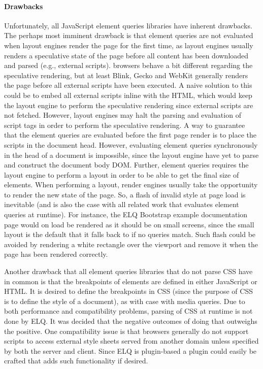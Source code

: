 \documentclass[a4paper,11pt]{kth-mag}
\begin{document}
    \paragraph{Drawbacks}
    Unfortunately, all \gls{JavaScript} element queries libraries have inherent drawbacks.
    The perhaps most imminent drawback is that element queries are not evaluated when \glspl{layout engine} render the page for the first time, as \glspl{layout engine} usually renders a speculative state of the page before all content has been downloaded and parsed (e.g., external scripts).
    \Glspl{browser} behave a bit different regarding the speculative rendering, but at least \gls{Blink}, \gls{Gecko} and \gls{WebKit} generally renders the page before all external scripts have been executed.
    A naive solution to this could be to embed all external scripts inline with the \gls{HTML}, which would keep the \gls{layout engine} to perform the speculative rendering since external scripts are not fetched.
    However, \glspl{layout engine} may halt the parsing and evaluation of script tags in order to perform the speculative rendering.
    A way to guarantee that the element queries are evaluated before the first page render is to place the scripts in the \gls{document} head.
    However, evaluating element queries synchronously in the head of a \gls{document} is impossible, since the \gls{layout engine} have yet to parse and construct the document body \gls{DOM}.
    Further, element queries requires the \gls{layout engine} to perform a layout in order to be able to get the final size of \glspl{element}.
    When performing a layout, render engines usually take the opportunity to render the new state of the page.
    So, a flash of invalid style at page load is inevitable (and is also the case with all related work that evaluates element queries at runtime).
    For instance, the \gls{ELQ} \gls{Bootstrap} example documentation page would on load be rendered as it should be on small screens, since the small layout is the default that it falls back to if no queries match.
    Such flash could be avoided by rendering a white rectangle over the \gls{viewport} and remove it when the page has been rendered correctly.

    Another drawback that all element queries libraries that do not parse \gls{CSS} have in common is that the breakpoints of \glspl{element} are defined in either \gls{JavaScript} or \gls{HTML}.
    It is desired to define the breakpoints in \gls{CSS} (since the purpose of \gls{CSS} is to define the style of a document), as with case with \gls{media queries}.
    Due to both performance and compatibility problems, parsing of \gls{CSS} at runtime is not done by \gls{ELQ}.
    It was decided that the negative outcomes of doing that outweighs the positive.
    One compatibility issue is that \glspl{browser} generally do not support scripts to access external style sheets served from another domain unless specified by both the server and client.
    Since \gls{ELQ} is plugin-based a plugin could easily be crafted that adds such functionality if desired.
\end{document}
